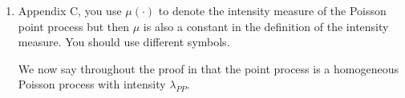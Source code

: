 \documentclass[11pt]{article}
\begin{document}
\begin{enumerate}[1.]
  \item Appendix C, you use $\mu(\cdot)$ to denote the intensity measure of the Poisson point process but then $\mu$ is also a constant in the definition of the intensity measure. You should use different symbols. \\

  \begin{response}
    We now say throughout the proof in  that the point process is a homogeneous Poisson process with intensity $\lambda_{PP}$.
  \end{response}
\end{enumerate}



\end{document}
